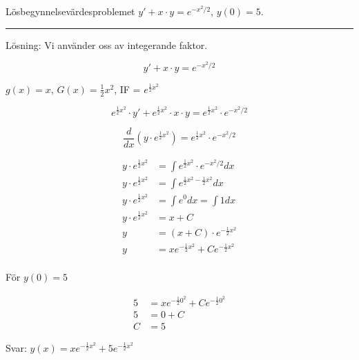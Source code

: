 \documentclass[11pt]{article}
\begin{document}
Lösbegynnelsevärdesproblemet $y' + x \cdot y = e^{-x^2 / 2}$, $y(0) = 5$.

\noindent\rule{\textwidth}{0.5pt}

Lösning: Vi använder oss av integerande faktor.

\begin{equation}
    y' + x \cdot y = e^{-x^2 / 2}
\end{equation}

$g(x) = x$, $G(x) = \frac{1}{2}x^2$, IF = $e^{\frac{1}{2}x^2}$

\begin{equation}
    e^{\frac{1}{2}x^2} \cdot y' + e^{\frac{1}{2}x^2} \cdot x \cdot y = e^{\frac{1}{2}x^2} \cdot e^{-x^2 / 2}
\end{equation}

\begin{equation}
    \frac{d}{dx}\left(y \cdot e^{\frac{1}{2}x^2}\right) = e^{\frac{1}{2}x^2} \cdot e^{-x^2 / 2}
\end{equation}

\begin{align}
    y \cdot e^{\frac{1}{2}x^2} &= \int e^{\frac{1}{2}x^2} \cdot e^{-x^2 / 2} dx\\
    y \cdot e^{\frac{1}{2}x^2} &= \int e^{\frac{1}{2}x^2  - \frac{1}{2}x^2} dx \\
    y \cdot e^{\frac{1}{2}x^2} &= \int e^0 dx = \int 1 dx \\
    y \cdot e^{\frac{1}{2}x^2} &= x + C\\
    y &= (x + C) \cdot e^{-\frac{1}{2}x^2} \\
    y &= xe^{-\frac{1}{2}x^2} + Ce^{-\frac{1}{2}x^2} \\
\end{align}

För $y(0) = 5$

\begin{align}
    5 &= xe^{-\frac{1}{2}0^2} + Ce^{-\frac{1}{2}0^2} \\
    5 &= 0 + C \\
    C &= 5
\end{align}

Svar: $y(x) = xe^{-\frac{1}{2}x^2} + 5e^{-\frac{1}{2}x^2}$
\end{document}
